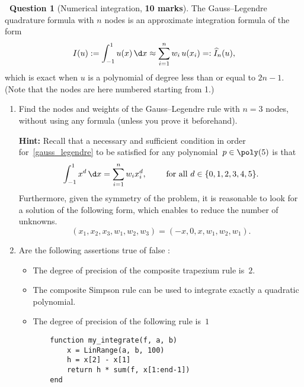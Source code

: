 \documentclass[10pt]{article}
\theoremstyle{definition}
\newtheorem{question}{{\normalfont \faGears}~Question}
\theoremstyle{remark}
\begin{document}
\newpage
\begin{question}
    [Numerical integration, \textbf{10 marks}]
    The Gauss--Legendre quadrature formula with $n$ nodes is an approximate integration formula of the form
    \begin{equation}
        \label{gauss_legendre}
        I(u) := \int_{-1}^{1} u(x) \, \d x \approx \sum_{i=1}^{n} w_i \, u(x_i) =: \widehat I_n(u),
    \end{equation}
    which is exact when $u$ is a polynomial of degree less than or equal to $2n-1$.
    (Note that the nodes are here numbered starting from 1.)

    \begin{enumerate}
        \item
            Find the nodes and weights of the Gauss--Legendre rule with $n=3$ nodes,
            without using any formula (unless you prove it beforehand).

            \textbf{Hint:}
            Recall that a necessary and sufficient condition in order for~\eqref{gauss_legendre} to be satisfied for any polynomial~$p \in \poly(5)$ is that
            \[
                \int_{-1}^{1} x^d \, \d x= \sum_{i=1}^{n} w_i x_i^d,
                \qquad \text{ for all $d \in \{0, 1, 2, 3, 4, 5\}$}.
            \]
            Furthermore, given the symmetry of the problem,
            it is reasonable to look for a solution of the following form,
            which enables to reduce the number of unknowns.
            \[
                (x_1, x_2, x_3, w_1, w_2, w_3)
                = (-x, 0, x, w_1, w_2, w_1).
            \]

        \item {} Are the following assertions true of false :
            \begin{itemize}
                \item
                    The degree of precision of the composite trapezium rule is~$2$.

                \item
                    The composite Simpson rule can be used to integrate exactly a quadratic polynomial.

                \item
                    The degree of precision of the following rule is~$1$
            \begin{verbatim}
    function my_integrate(f, a, b)
        x = LinRange(a, b, 100)
        h = x[2] - x[1]
        return h * sum(f, x[1:end-1])
    end
            \end{verbatim}


\end{itemize}
\end{enumerate}
\end{question}
\end{document}
